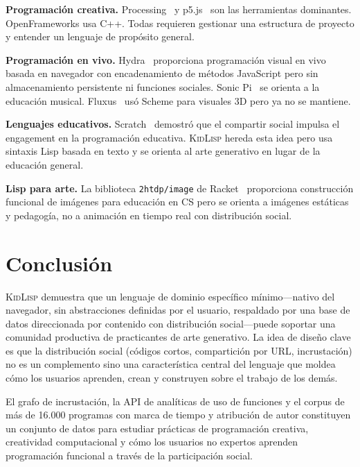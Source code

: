 \documentclass[10pt,letterpaper,twocolumn]{article}
\newcommand{\kidlisp}{\textsc{KidLisp}}
\begin{document}
\textbf{Programación creativa.} Processing~\citep{reas2007processing} y p5.js~\citep{mccarthy2015p5js} son las herramientas dominantes. OpenFrameworks usa C++. Todas requieren gestionar una estructura de proyecto y entender un lenguaje de propósito general.

\textbf{Programación en vivo.} Hydra~\citep{hydra2019} proporciona programación visual en vivo basada en navegador con encadenamiento de métodos JavaScript pero sin almacenamiento persistente ni funciones sociales. Sonic Pi~\citep{aaron2016sonic} se orienta a la educación musical. Fluxus~\citep{fluxus2007} usó Scheme para visuales 3D pero ya no se mantiene.

\textbf{Lenguajes educativos.} Scratch~\citep{resnick2009scratch} demostró que el compartir social impulsa el engagement en la programación educativa. \kidlisp{} hereda esta idea pero usa sintaxis Lisp basada en texto y se orienta al arte generativo en lugar de la educación general.

\textbf{Lisp para arte.} La biblioteca \texttt{2htdp/image} de Racket~\citep{racket2018} proporciona construcción funcional de imágenes para educación en CS pero se orienta a imágenes estáticas y pedagogía, no a animación en tiempo real con distribución social.


\section{Conclusión}

\kidlisp{} demuestra que un lenguaje de dominio específico mínimo---nativo del navegador, sin abstracciones definidas por el usuario, respaldado por una base de datos direccionada por contenido con distribución social---puede soportar una comunidad productiva de practicantes de arte generativo. La idea de diseño clave es que la distribución social (códigos cortos, compartición por URL, incrustación) no es un complemento sino una característica central del lenguaje que moldea cómo los usuarios aprenden, crean y construyen sobre el trabajo de los demás.

El grafo de incrustación, la API de analíticas de uso de funciones y el corpus de más de 16.000 programas con marca de tiempo y atribución de autor constituyen un conjunto de datos para estudiar prácticas de programación creativa, creatividad computacional y cómo los usuarios no expertos aprenden programación funcional a través de la participación social.
\end{document}
